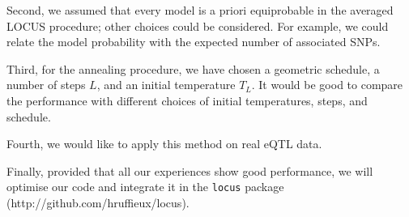 \documentclass[a4paper, 11pt]{report}
\numberwithin{equation}{chapter}
\begin{document}
Second, we assumed that every model is a priori equiprobable in the averaged LOCUS procedure; other choices could be considered. For example, we could relate the model probability with the expected number of associated SNPs.

Third, for the annealing procedure, we have chosen a geometric schedule, a number of steps $L$, and an initial temperature $T_L$. It would be good to compare the performance with different choices of initial temperatures, steps, and schedule.


Fourth, we would like to apply this method on real eQTL data.

Finally, provided that all our experiences show good performance, we will optimise our code and integrate it in the \texttt{locus} package\\
 (http://github.com/hruffieux/locus).
\newpage


\end{document}
